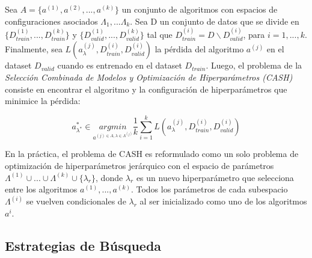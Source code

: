 \begin{definition}
	Sea $A = \{a^{(1)}, a^{(2)}, ..., a^{(k)}\}$ un conjunto de algoritmos con espacios de configuraciones asociados $\Lambda_1, ... \Lambda_k$. Sea D un conjunto de datos que se divide en $\{D_{train}^{(1)}, ..., D_{train}^{(k)}\}$ y $\{D_{valid}^{(1)}, ..., D_{valid}^{(k)}\}$ tal que $D^{(i)}_{train} = D\backslash D_{valid}^{(i)}$, para $i=1,...,k$. Finalmente, sea $L(a_\lambda^{(j)}, D_{train}^{(i)}, D_{valid}^{(i)})$ la pérdida del algoritmo $a^{(j)}$ en el dataset $D_{valid}$ cuando es entrenado en el dataset $D_{train}$. Luego, el problema de la \textsl{Selección Combinada de Modelos y Optimización de Hiperparámetros (CASH)} consiste en encontrar el algoritmo y la configuración de hiperparámetros que minimice la pérdida:
	
	\begin{equation}\label{cash}
	 a^*_{\lambda^*} \in \underset{a^{(j) \in A, \lambda \in \Lambda^{(j)}}}{argmin} \dfrac{1}{k} \sum_{i=1}^{k} L\left(a_\lambda^{(j)}, D_{train}^{(i)}, D_{valid}^{(i)}\right)
	\end{equation}
\end{definition}   


En la práctica, el problema de CASH es reformulado como un solo problema de optimización de hiperparámetros jerárquico con el espacio de parámetros $\Lambda^{(1)}\cup ... \cup \Lambda^{(k)} \cup\{\lambda_r\}$, donde $\lambda_r$ es un nuevo hiperparámetro que selecciona entre los algoritmos $a^{(1)}, ..., a^{(k)}$. Todos los parámetros de cada subespacio $\Lambda^{(i)}$ se vuelven condicionales de $\lambda_r$ al ser inicializado como uno de los algoritmos $a^i$.
 
\subsection{Estrategias de Búsqueda}\label{subsec:automl_methods}


